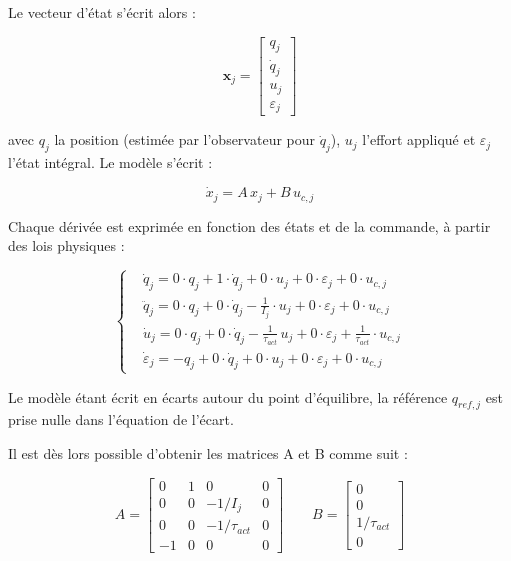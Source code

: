 Le vecteur d'état s'écrit alors :

\begin{equation}
    \boldsymbol{x}_j =
    \begin{bmatrix} q_j \\ \dot q_j \\ u_j \\ \varepsilon_j \end{bmatrix}
\end{equation}

avec $q_j$ la position (estimée par l'observateur pour $\dot q_j$), $u_j$ l'effort appliqué et $\varepsilon_j$ l'état intégral. Le modèle s'écrit :

\begin{equation}
    \dot x_j = A\,x_j + B\,u_{c,j}
\end{equation}

Chaque dérivée est exprimée en fonction des états et de la commande, à partir des lois physiques :

\begin{equation}
    \left\{
    \begin{aligned}
         & \dot q_j = 0\cdot q_j + 1\cdot \dot q_j + 0\cdot u_j + 0\cdot \varepsilon_j + 0 \cdot u_{c,j}                                \\
         & \ddot q_j = 0\cdot q_j + 0\cdot \dot q_j - \frac{1}{I_j}\cdot u_j + 0\cdot \varepsilon_j + 0 \cdot u_{c,j}                   \\
         & \dot u_j = 0\cdot q_j + 0\cdot\dot q_j -\frac{1}{\tau_{act}}\,u_j + 0\cdot \varepsilon_j + \frac{1}{\tau_{act}}\cdot u_{c,j} \\
         & \dot\varepsilon_j = -q_j + 0\cdot \dot q_j + 0\cdot u_j + 0\cdot \varepsilon_j + 0\cdot u_{c,j}
    \end{aligned}
    \right.
\end{equation}

Le modèle étant écrit en écarts autour du point d'équilibre, la référence $q_{ref,j}$ est prise nulle dans l'équation de l'écart.

Il est dès lors possible d'obtenir les matrices A et B comme suit :

\begin{equation}
    A =
    \begin{bmatrix}
        0  & 1 & 0             & 0 \\
        0  & 0 & -1/I_j        & 0 \\
        0  & 0 & -1/\tau_{act} & 0 \\
        -1 & 0 & 0             & 0
    \end{bmatrix}
    \qquad
    B =
    \begin{bmatrix} 0\\ 0\\ 1/\tau_{act}\\ 0 \end{bmatrix}
    \label{eq:modele-etat}
\end{equation}

